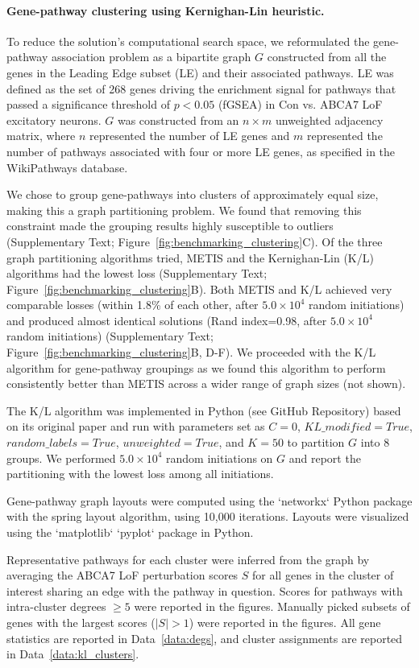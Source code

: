 \paragraph{Gene-pathway clustering using Kernighan-Lin heuristic.}
To reduce the solution's computational search space, we reformulated the gene-pathway association problem as a bipartite graph $G$ constructed from all the genes in the Leading Edge subset (LE) and their associated pathways. LE was defined as the set of 268 genes driving the enrichment signal for pathways that passed a significance threshold of $p < 0.05$ (fGSEA) in Con vs. ABCA7 LoF excitatory neurons. $G$ was constructed from an $n \times m$ unweighted adjacency matrix, where $n$ represented the number of LE genes and $m$ represented the number of pathways associated with four or more LE genes, as specified in the WikiPathways database.

We chose to group gene-pathways into clusters of approximately equal size, making this a graph partitioning problem. We found that removing this constraint made the grouping results highly susceptible to outliers (Supplementary Text; Figure~\ref{fig:benchmarking_clustering}C). Of the three graph partitioning algorithms tried, METIS and the Kernighan-Lin (K/L) algorithms had the lowest loss (Supplementary Text; Figure~\ref{fig:benchmarking_clustering}B). Both METIS and K/L achieved very comparable losses (within 1.8\% of each other, after $5.0 \times 10^4$ random initiations) and produced almost identical solutions (Rand index=0.98, after $5.0 \times 10^4$ random initiations) (Supplementary Text; Figure~\ref{fig:benchmarking_clustering}B, D-F). We proceeded with the K/L algorithm for gene-pathway groupings as we found this algorithm to perform consistently better than METIS across a wider range of graph sizes (not shown).

The K/L algorithm was implemented in Python (see GitHub Repository) based on its original paper \cite{Kernighan1970-zl} and run with parameters set as $C=0$, $KL\_modified=True$, $random\_labels=True$, $unweighted=True$, and $K=50$ to partition $G$ into 8 groups. We performed $5.0 \times 10^4$ random initiations on $G$ and report the partitioning with the lowest loss among all initiations.

Gene-pathway graph layouts were computed using the `networkx` Python package with the spring layout algorithm, using 10,000 iterations. Layouts were visualized using the `matplotlib` `pyplot` package in Python. 

Representative pathways for each cluster were inferred from the graph by averaging the ABCA7 LoF perturbation scores $S$ for all genes in the cluster of interest sharing an edge with the pathway in question. Scores for pathways with intra-cluster degrees $\geq 5$ were reported in the figures. Manually picked subsets of genes with the largest scores ($|S| > 1$) were reported in the figures. All gene statistics are reported in Data~\ref{data:degs}, and cluster assignments are reported in Data~\ref{data:kl_clusters}.

